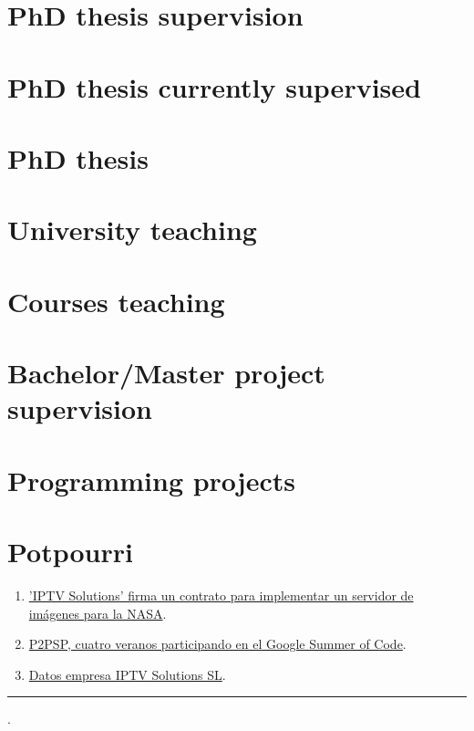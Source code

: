 \documentclass{article}
\begin{document}
\renewcommand{\refname}{}
\section{PhD thesis supervision}


\renewcommand{\refname}{}
\section{PhD thesis currently supervised}


\section{PhD thesis}


\section{University teaching}


\renewcommand{\refname}{}
\section{Courses teaching}


\renewcommand{\refname}{}
\section{Bachelor/Master project supervision}


%

\renewcommand{\refname}{}
\section{Programming projects}


\renewcommand{\refname}{}
\section{Potpourri}
\begin{enumerate}
\item \href{https://www.hpca.ual.es/~vruiz/backups/NASA.pdf}{'IPTV Solutions' firma un contrato para implementar un servidor de imágenes para la NASA}.
\item \href{https://www.hpca.ual.es/~vruiz/backups/P2PSP.pdf}{P2PSP, cuatro veranos participando en el Google Summer of Code}.
\item \href{https://www.hpca.ual.es/~vruiz/backups/IPTV_solutions.pdf}{Datos empresa IPTV Solutions SL}.
\end{enumerate}


\hrule
\currenttime.
\end{document}
